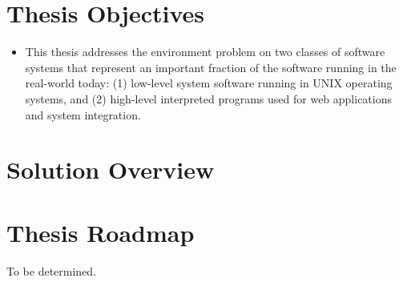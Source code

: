 
\section{Thesis Objectives}

\begin{itemize}
\item This thesis addresses the environment problem on two classes of software systems that represent an important fraction of the software running in the real-world today: (1) low-level system software running in UNIX operating systems, and (2) high-level interpreted programs used for web applications and system integration.
\end{itemize}


\section{Solution Overview}


\section{Thesis Roadmap}

To be determined.


